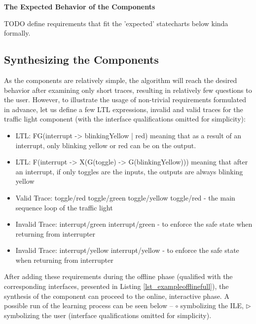 \textbf{The Expected Behavior of the Components} 

TODO define requirements that fit the 'expected' statecharts below kinda formally.


\subsection{Synthesizing the Components} \label{subs_casestudysynth}

As the components are relatively simple, the algorithm will reach the desired behavior after examining only short traces, resulting in relatively few questions to the user. However, to illustrate the usage of non-trivial requirements formulated in advance, let us define a few LTL expressions, invalid and valid traces for the traffic light component (with the interface qualifications omitted for simplicity):

\begin{itemize}
	\item LTL: FG(interrupt -> blinkingYellow | red) meaning that as a result of an interrupt, only blinking yellow or red can be on the output. 
	\item LTL: F(interrupt -> X(G(toggle) -> G(blinkingYellow))) meaning that after an interrupt, if only toggles are the inputs, the outputs are always blinking yellow
	\item Valid Trace: toggle/red toggle/green toggle/yellow toggle/red - the main sequence loop of the traffic light
	\item Invalid Trace: interrupt/green interrupt/green - to enforce the safe state when returning from interrupter
	\item Invalid Trace: interrupt/yellow interrupt/yellow - to enforce the safe state when returning from interrupter 
\end{itemize}

After adding these requirements during the offline phase (qualified with the corresponding interfaces, presented in Listing \ref{lst_exampleofflinefull}), the synthesis of the component can proceed to the online, interactive phase. A possible run of the learning process can be seen below -- $\circ$ symbolizing the ILE, $\triangleright$ symbolizing the user (interface qualifications omitted for simplicity). 

